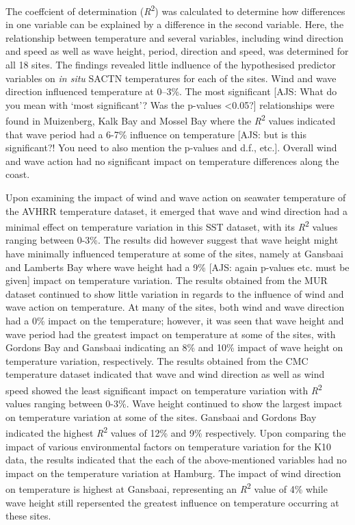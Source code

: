\documentclass[12pt,A4paper,]{article}
\begin{document}
The coeffcient of determination (\emph{R}\textsuperscript{2}) was
calculated to determine how differences in one variable can be explained
by a difference in the second variable. Here, the relationship between
temperature and several variables, including wind direction and speed as
well as wave height, period, direction and speed, was determined for all
18 sites. The findings revealed little indluence of the hypothesised
predictor variables on \emph{in situ} SACTN temperatures for each of the
sites. Wind and wave direction influenced temperature at 0--3\%. The
most significant {[}AJS: What do you mean with `most significant'? Was
the p-values \textless{}0.05?{]} relationships were found in Muizenberg,
Kalk Bay and Mossel Bay where the \emph{R}\textsuperscript{2} values
indicated that wave period had a 6-7\% influence on temperature {[}AJS:
but is this significant?! You need to also mention the p-values and
d.f., etc.{]}. Overall wind and wave action had no significant impact on
temperature differences along the coast.

Upon examining the impact of wind and wave action on seawater
temperature of the AVHRR temperature dataset, it emerged that wave and
wind direction had a minimal effect on temperature variation in this SST
dataset, with its \emph{R}\textsuperscript{2} values ranging between
0-3\%. The results did however suggest that wave height might have
minimally influenced temperature at some of the sites, namely at
Gansbaai and Lamberts Bay where wave height had a 9\% {[}AJS: again
p-values etc. must be given{]} impact on temperature variation. The
results obtained from the MUR dataset continued to show little variation
in regards to the influence of wind and wave action on temperature. At
many of the sites, both wind and wave direction had a 0\% impact on the
temperature; however, it was seen that wave height and wave period had
the greatest impact on temperature at some of the sites, with Gordons
Bay and Gansbaai indicating an 8\% and 10\% impact of wave height on
temperature variation, respectively. The results obtained from the CMC
temperature dataset indicated that wave and wind direction as well as
wind speed showed the least significant impact on temperature variation
with \emph{R}\textsuperscript{2} values ranging between 0-3\%. Wave
height continued to show the largest impact on temperature variation at
some of the sites. Gansbaai and Gordons Bay indicated the highest
\emph{R}\textsuperscript{2} values of 12\% and 9\% respectively. Upon
comparing the impact of various environmental factors on temperature
variation for the K10 data, the results indicated that the each of the
above-mentioned variables had no impact on the temperature variation at
Hamburg. The impact of wind direction on temperature is highest at
Gansbaai, representing an \emph{R}\textsuperscript{2} value of 4\% while
wave height still repersented the greatest influence on temperature
occurring at these sites.
\end{document}
